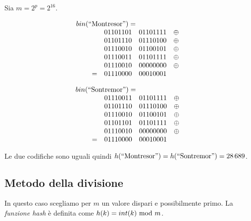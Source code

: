 \begin{eg}
    Sia $m=2^p=2^{16}$.\\
    \begin{minipage}[t]{0.48\textwidth}
        \vspace{-0.75cm}
        \[bin(\text{\q{Montresor}})=
        \hspace{-2.5cm}\begin{array}[t]{lccl}
            \\
            & 01101101 & 01101111 & \oplus\\
            & 01101110 & 01110100 & \oplus\\
            & 01110010 & 01100101 & \oplus\\
            & 01110011 & 01101111 & \oplus\\
            & 01110010 & 00000000 & \oplus\\
            = & 01110000 & 00010001
        \end{array}\]
    \end{minipage}
    \hfill
    \begin{minipage}[t]{0.48\textwidth}
        \vspace{-0.75cm}
        \[bin(\text{\q{Sontremor}})=
        \hspace{-2.5cm}\begin{array}[t]{lccl}
            \\
            & 01110011 & 01101111 & \oplus\\
            & 01101110 & 01110100 & \oplus\\
            & 01110010 & 01100101 & \oplus\\
            & 01101101 & 01101111 & \oplus\\
            & 01110010 & 00000000 & \oplus\\
            = & 01110000 & 00010001
        \end{array}\]
    \end{minipage}
    Le due codifiche sono uguali quindi $h(\text{``Montresor''})=h(\text
    {``Sontremor''})=28\,689$.
\end{eg}

\subsection{Metodo della divisione}
In questo caso scegliamo per $m$ un valore dispari e possibilmente primo. La
\emph{funzione hash} è definita come $h(k)=int(k)\ \mathrm{mod}\ m$.


